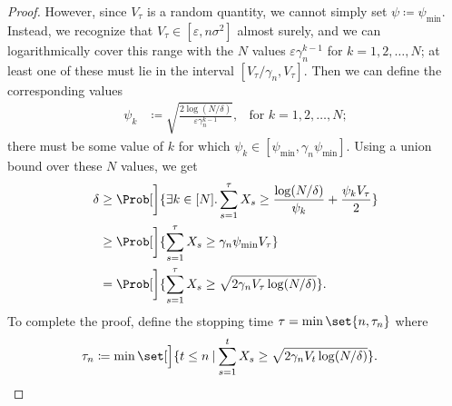 \documentclass{article}
\newcommand{\defeq}{\coloneq}
\newcommand\given[1][\delimsize]{%
  \providecommand{\delimsize}{}
  \nonscript\:#1\vert\allowbreak\nonscript\:\mathopen{}
}
\begin{document}
\begin{lemma}
\begin{proof}
    However, since $V_\tau$ is a random quantity, we cannot simply set
    $\psi \defeq \psi_{\min}$.  Instead, we recognize that
    $V_\tau \in [\varepsilon, n\sigma^2]$ almost surely, and we can
    logarithmically cover this range with the $N$ values
    $\varepsilon\gamma_n^{k-1}$ for $k=1,2,\dotsc,N$; at least one of
    these must lie in the interval $[V_\tau/\gamma_n, V_\tau]$.  Then
    we can define the corresponding values
    \begin{align*}
      \psi_k &\defeq \sqrt{\frac{2\log(N/\delta)}{\varepsilon\gamma_n^{k-1}}},
              &\text{for } k=1,2,\dotsc,N;
    \end{align*}
    there must be some value of $k$ for which
    $\psi_k \in [\psi_{\min}, \gamma_n\psi_{\min}]$.  Using a union bound
    over these $N$ values, we get
    \begin{align*}
      \delta
      &\ge \Prob[\bigg]{\exists k\in[N]. \sum_{s=1}^\tau X_s \ge \frac{\log(N/\delta)}{\psi_k} + \frac{\psi_k V_\tau}{2}} \\
      &\ge \Prob[\bigg]{\sum_{s=1}^\tau X_s \ge \gamma_n\psi_{\min}V_\tau} \\
      &= \Prob[\bigg]{\sum_{s=1}^\tau X_s \ge \sqrt{2\gamma_nV_\tau\log(N/\delta)}}.
    \end{align*}
    To complete the proof, define the stopping time $\tau =
    \min\set{n,\tau_n}$ where
    \begin{align*}
      \tau_n &\defeq \min\set[\Big]{t \le n \given \sum_{s=1}^tX_s \ge \sqrt{2\gamma_nV_t\log(N/\delta)}}.
              \qedhere
    \end{align*}
  \end{proof}
\end{lemma}
\end{document}
